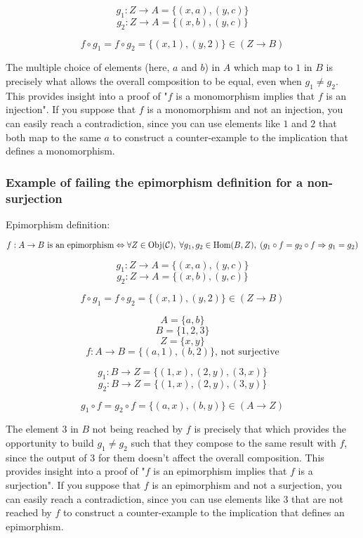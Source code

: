 $$g_1 : Z \to A = \{ (x, a), (y, c) \}$$
$$g_2 : Z \to A = \{ (x, b), (y, c) \}$$

$$f \circ g_1 = f \circ g_2 = \{(x, 1), (y, 2)\} \in (Z \to B)$$

The multiple choice of elements (here, $a$ and $b$) in $A$ which map to $1$ in $B$ is precisely what allows the overall composition to be equal, even when $g_1 \neq g_2$. This provides insight into a proof of "$f$ is a monomorphism implies that $f$ is an injection". If you suppose that $f$ is a monomorphism and not an injection, you can easily reach a contradiction, since you can use elements like $1$ and $2$ that both map to the same $a$ to construct a counter-example to the implication that defines a monomorphism.



\subsubsection*{Example of failing the epimorphism definition for a non-surjection}

Epimorphism definition:

$$
\text{$f : A \to B$ is an epimorphism}
\\ \Leftrightarrow \\ 
\forall Z \in \text{Obj}(\mathcal{C}), \;
\forall g_1, g_2 \in \text{Hom}(B, Z), \;
(g_1 \circ f = g_2 \circ f \Rightarrow g_1 = g_2)
$$



$$g_1 : Z \to A = \{ (x, a), (y, c) \}$$
$$g_2 : Z \to A = \{ (x, b), (y, c) \}$$

$$f \circ g_1 = f \circ g_2 = \{(x, 1), (y, 2)\} \in (Z \to B)$$


$$A = \{ a, b    \}$$
$$B = \{ 1, 2, 3 \}$$
$$Z = \{ x, y    \}$$
$$f : A \to B = \{ (a, 1), (b, 2) \} \text{, not surjective}$$


$$g_1 : B \to Z = \{ (1, x), (2, y), (3, x) \}$$
$$g_2 : B \to Z = \{ (1, x), (2, y), (3, y) \}$$

$$g_1 \circ f = g_2 \circ f = \{(a, x), (b, y)\} \in (A \to Z)$$

The element $3$ in $B$ not being reached by $f$ is precisely that which provides the opportunity to build $g_1 \neq g_2$ such that they compose to the same result with $f$, since the output of $3$ for them doesn't affect the overall composition. This provides insight into a proof of "$f$ is an epimorphism implies that $f$ is a surjection". If you suppose that $f$ is an epimorphism and not a surjection, you can easily reach a contradiction, since you can use elements like $3$ that are not reached by $f$ to construct a counter-example to the implication that defines an epimorphism.



